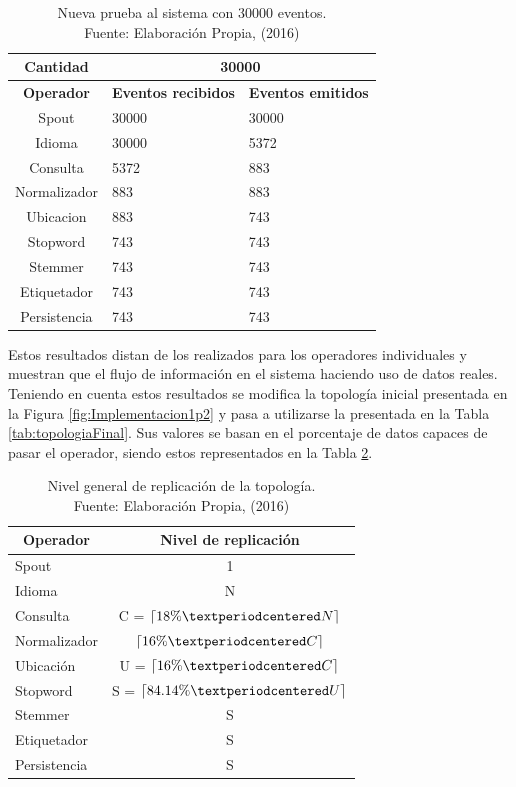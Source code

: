 \begin{table}[H]
\centering
\caption[Nueva prueba al sistema con 30000 eventos.]{Nueva prueba al sistema con 30000 eventos.\\Fuente: Elaboración Propia, (2016)}
\label{tab:sistemaCompletoEstadosCorregidos}
\begin{tabular}{|c|l|l|}
\hline
\textbf{Cantidad} & \multicolumn{2}{c|}{\textbf{30000}} \\ \hline
\textbf{Operador} & \multicolumn{1}{c|}{\textbf{Eventos recibidos}} & \multicolumn{1}{c|}{\textbf{Eventos emitidos}} \\ \hline
Spout & 30000 & 30000 \\ \hline
Idioma & 30000 & 5372 \\ \hline
Consulta & 5372 & 883 \\ \hline
Normalizador & 883 & 883 \\ \hline
Ubicacion & 883 & 743 \\ \hline
Stopword & 743 & 743 \\ \hline
Stemmer & 743 & 743 \\ \hline
Etiquetador & 743 & 743 \\ \hline
Persistencia & 743 & 743 \\ \hline
\end{tabular}
\end{table}

Estos resultados distan de los realizados para los operadores individuales y muestran que el flujo de información en el sistema haciendo uso de datos reales. Teniendo en cuenta estos resultados se modifica la topología inicial presentada en la Figura \ref{fig:Implementacion1p2} y pasa a utilizarse la presentada en la Tabla \ref{tab:topologiaFinal}. Sus valores se basan en el porcentaje de datos capaces de pasar el operador, siendo estos representados en la Tabla \ref{tab:topologiaFinal2}.

\begin{table}[H]
\caption[Nivel general de replicación de la topología.]{Nivel general de replicación de la topología.\\Fuente: Elaboración Propia, (2016)}
\centering
\label{tab:topologiaFinal2}
\begin{tabular}{|l|c|}
\hline
\multicolumn{1}{|c|}{\textbf{Operador}} & \textbf{Nivel de replicación} \\ \hline
Spout & 1 \\ \hline
Idioma & N \\ \hline
Consulta & C = $\ceil{18\% · N}$ \\ \hline
Normalizador & $\ceil{16\% · C}$ \\ \hline
Ubicación & U = $\ceil{16\% · C}$ \\ \hline
Stopword & S = $\ceil{84.14\% · U}$ \\ \hline
Stemmer & S \\ \hline
Etiquetador & S \\ \hline
Persistencia & S \\ \hline
\end{tabular}
\end{table}
        
